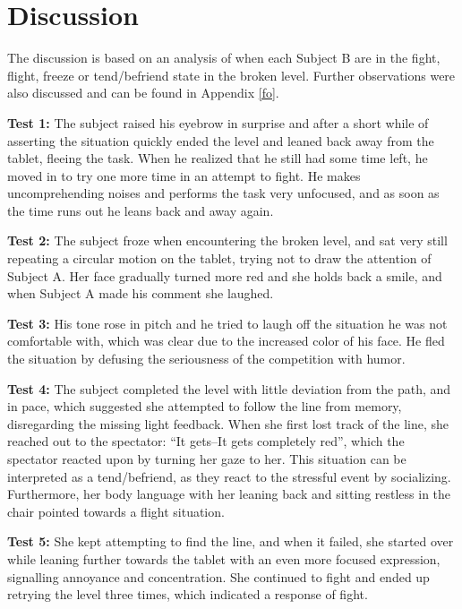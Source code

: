 \section{Discussion}
The discussion is based on an analysis of when each Subject B are in the fight, flight, freeze or tend/befriend state in the broken level. Further observations were also discussed and can be found in Appendix \ref{fo}.

\textbf{Test 1:} The subject raised his eyebrow in surprise and after a short while of asserting the situation quickly ended the level and leaned back away from the tablet, fleeing the task. When he realized that he still had some time left, he moved in to try one more time in an attempt to fight. He makes uncomprehending noises and performs the task very unfocused, and as soon as the time runs out he leans back and away again. 

\textbf{Test 2:} The subject froze when encountering the broken level, and sat very still repeating a circular motion on the tablet, trying not to draw the attention of Subject A. Her face gradually turned more red and she holds back a smile, and when Subject A made his comment she laughed. 

\textbf{Test 3:} His tone rose in pitch and he tried to laugh off the situation he was not comfortable with, which was clear due to the increased color of his face. He fled the situation by defusing the seriousness of the competition with humor.

\textbf{Test 4: }The subject completed the level with little deviation from the path, and in pace, which suggested she attempted to follow the line from memory, disregarding the missing light feedback. When she first lost track of the line, she reached out to the spectator: “It gets--It gets completely red”, which the spectator reacted upon by turning her gaze to her. This situation can be interpreted as a tend/befriend, as they react to the stressful event by socializing. Furthermore, her body language with her leaning back and sitting restless in the chair pointed towards a flight situation. 

\textbf{Test 5:} She kept attempting to find the line, and when it failed, she started over while leaning further towards the tablet with an even more focused expression, signalling annoyance and concentration. She continued to fight and ended up retrying the level three times, which indicated a response of fight.

